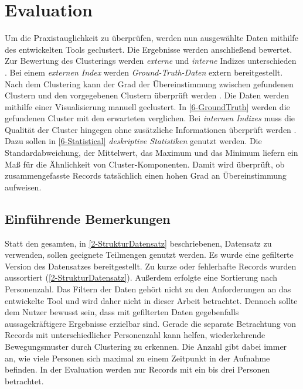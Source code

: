 \chapter{Evaluation}
\label{chapter6}
Um die Praxistauglichkeit zu überprüfen, werden nun ausgewählte Daten
mithilfe des entwickelten Tools geclustert.
Die Ergebnisse werden anschließend bewertet.
Zur Bewertung des Clusterings werden \emph{externe}
und \emph{interne} Indizes unterschieden \citep{aghabozorgi_time-series_2015, warren_liao_clustering_2005}.
Bei einem \emph{externen Index} werden \emph{Ground-Truth-Daten} extern bereitgestellt.
Nach dem Clustering kann der Grad der Übereinstimmung zwischen gefundenen Clustern
und den vorgegebenen Clustern überprüft werden \citep{aghabozorgi_time-series_2015, warren_liao_clustering_2005}.
Die Daten werden mithilfe einer Visualisierung manuell geclustert.
In \autoref{6-GroundTruth} werden die gefundenen Cluster mit den erwarteten verglichen.
Bei \emph{internen Indizes} muss die Qualität der Cluster hingegen
ohne zusätzliche Informationen überprüft werden \citep{aghabozorgi_time-series_2015, warren_liao_clustering_2005}.
Dazu sollen in \autoref{6-Statistical} \emph{deskriptive Statistiken} genutzt werden.
Die Standardabweichung, der Mittelwert, das Maximum und das Minimum liefern
ein Maß für die Ähnlichkeit von Cluster-Komponenten.
Damit wird überprüft,
ob zusammengefasste Records tatsächlich einen hohen Grad an Übereinstimmung aufweisen.

\section{Einführende Bemerkungen}
\label{6-Bemerkungen}
Statt den gesamten, in \autoref{2-StrukturDatensatz} beschriebenen, Datensatz zu verwenden,
sollen geeignete Teilmengen genutzt werden.
Es wurde eine gefilterte Version des Datensatzes bereitgestellt.
Zu kurze oder fehlerhafte Records wurden aussortiert (\autoref{2-StrukturDatensatz}).
Außerdem erfolgte eine Sortierung nach Personenzahl.
Das Filtern der Daten gehört nicht zu den Anforderungen an das entwickelte Tool
und wird daher nicht in dieser Arbeit betrachtet.
Dennoch sollte dem Nutzer bewusst sein,
dass mit gefilterten Daten gegebenfalls aussagekräftigere Ergebnisse erzielbar sind.
Gerade die separate Betrachtung von Records mit unterschiedlicher Personenzahl kann helfen,
wiederkehrende Bewegungsmuster durch Clustering zu erkennen.
Die Anzahl gibt dabei immer an, wie viele Personen sich maximal
zu einem Zeitpunkt in der Aufnahme befinden.
In der Evaluation werden nur Records mit ein bis drei Personen betrachtet.

